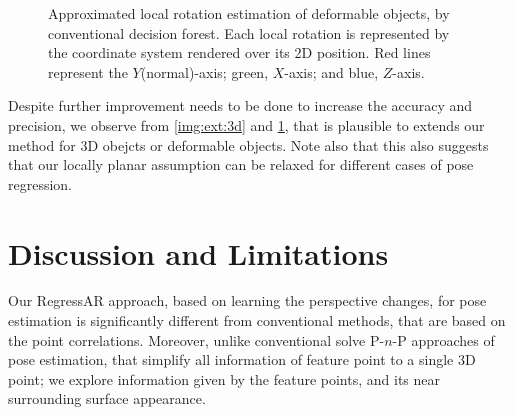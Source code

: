 \documentclass[annual]{acmsiggraph}
\begin{document}
\begin{figure}[h]
\caption{Approximated local rotation estimation of deformable objects, by conventional decision forest. Each local rotation is represented by the coordinate system rendered over its 2D position. Red lines represent the $Y$(normal)-axis; green, $X$-axis; and blue, $Z$-axis.}
\label{img:ext:deform}
\end{figure}
  

Despite further improvement needs to be done to increase the accuracy and precision, we observe from \ref{img:ext:3d} and \ref{img:ext:deform}, that is plausible to extends our method for 3D obejcts or deformable objects. Note also that this also suggests that our locally planar assumption can be relaxed for different cases of pose regression.  



\section{Discussion and Limitations}
\label{sec:discussion}






	
Our RegressAR approach, based on learning the perspective changes, for pose estimation is significantly different from conventional methods, that are based on the point correlations. Moreover, unlike conventional solve P-$n$-P approaches of pose estimation, that simplify all information of feature point to a single 3D point; we explore information given by the feature points, and its near surrounding surface appearance. 
\end{document}
